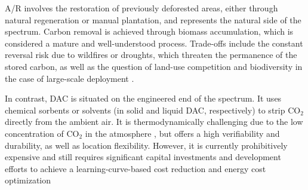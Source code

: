 A/R involves the restoration of previously deforested areas, either through natural regeneration or manual plantation, and represents the natural side of the spectrum. Carbon removal is achieved through biomass accumulation, which is considered a mature and well-understood process. Trade-offs include the constant reversal risk due to wildfires or droughts, which threaten the permanence of the stored carbon, as well as the question of land-use competition and biodiversity in the case of large-scale deployment \parencite{gunther_carbon_2024}.\vspace{2mm}

In contrast, DAC is situated on the engineered end of the spectrum. It uses chemical sorbents or solvents (in solid and liquid DAC, respectively) to strip CO$_2$ directly from the ambient air. It is thermodynamically challenging due to the low concentration of CO$_2$ in the atmosphere \parencite{lackner_thermodynamics_2013}, but offers a high verifiability and durability, as well as location flexibility. However, it is currently prohibitively expensive and still requires significant capital investments and development efforts to achieve a learning-curve-based cost reduction and energy cost optimization \parencite{lackner_buying_2021, babacan_role_2020}\vspace{2mm}


